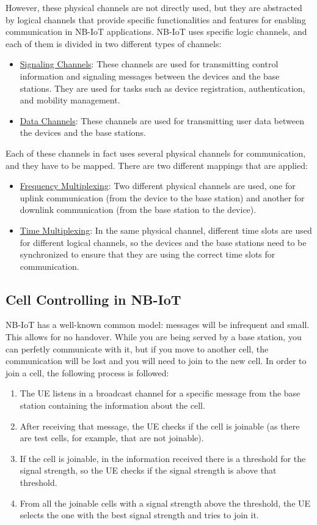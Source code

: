 However, these physical channels are not directly used, but they are abstracted by logical channels that provide specific functionalities and features for enabling communication in NB-IoT applications. NB-IoT uses specific logic channels, and each of them is divided in two different types of channels:
\begin{itemize}
    \item \ul{Signaling Channels}: These channels are used for transmitting control information and signaling messages between the devices and the base stations. They are used for tasks such as device registration, authentication, and mobility management.
    \item \ul{Data Channels}: These channels are used for transmitting user data between the devices and the base stations.
\end{itemize}

Each of these channels in fact uses several physical channels for communication, and they have to be mapped. There are two different mappings that are applied:
\begin{itemize}
    \item \ul{Frequency Multiplexing}: Two different physical channels are used, one for uplink communication (from the device to the base station) and another for downlink communication (from the base station to the device).
    \item \ul{Time Multiplexing}: In the same physical channel, different time slots are used for different logical channels, so the devices and the base stations need to be synchronized to ensure that they are using the correct time slots for communication.
\end{itemize}
    
\subsection{Cell Controlling in NB-IoT}

NB-IoT has a well-known common model: messages will be infrequent and small. This allows for no handover. While you are being served by a base station, you can perfetly communicate with it, but if you move to another cell, the communication will be lost and you will need to join to the new cell. In order to join a cell, the following process is followed:
\begin{enumerate}
    \item The UE listens in a broadcast channel for a specific message from the base station containing the information about the cell.
    \item After receiving that message, the UE checks if the cell is joinable (as there are test cells, for example, that are not joinable).
    \item If the cell is joinable, in the information received there is a threshold for the signal strength, so the UE checks if the signal strength is above that threshold.
    \item From all the joinable cells with a signal strength above the threshold, the UE selects the one with the best signal strength and tries to join it.
\end{enumerate}

